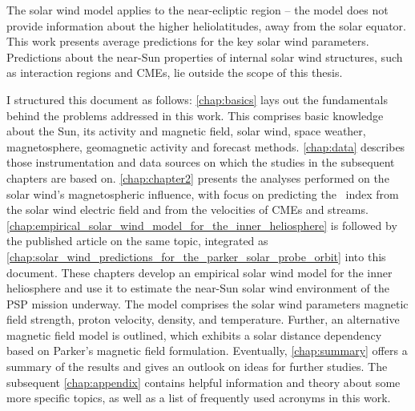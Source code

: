 The solar wind model applies to the near-ecliptic region -- the model does not provide information about the higher heliolatitudes, away from the solar equator.
This work presents average predictions for the key solar wind parameters. Predictions about the near-Sun properties of internal solar wind structures, such as interaction regions and CMEs, lie outside the scope of this thesis.\\



\bigskip

I structured this document as follows: \autoref{chap:basics} lays out the fundamentals behind the problems addressed in this work. This comprises basic knowledge about the Sun, its activity and magnetic field, solar wind, space weather, magnetosphere, geomagnetic activity and forecast methods. \autoref{chap:data} describes those instrumentation and data sources on which the studies in the subsequent chapters are based on. \autoref{chap:chapter2} presents the analyses performed on the solar wind's magnetospheric influence, with focus on predicting the \Kp~index from the solar wind electric field and from the velocities of CMEs and streams. \autoref{chap:empirical_solar_wind_model_for_the_inner_heliosphere} is followed by the published article on the same topic, integrated as \autoref{chap:solar_wind_predictions_for_the_parker_solar_probe_orbit} into this document. These chapters develop an empirical solar wind model for the inner heliosphere and use it to estimate the near-Sun solar wind environment of the PSP mission underway. The model comprises the solar wind parameters magnetic field strength, proton velocity, density, and temperature. Further, an alternative magnetic field model is outlined, which exhibits a solar distance dependency based on Parker's magnetic field formulation. Eventually, \autoref{chap:summary} offers a summary of the results and gives an outlook on ideas for further studies. The subsequent \autoref{chap:appendix} contains helpful information and theory about some more specific topics, as well as a list of frequently used acronyms in this work.


